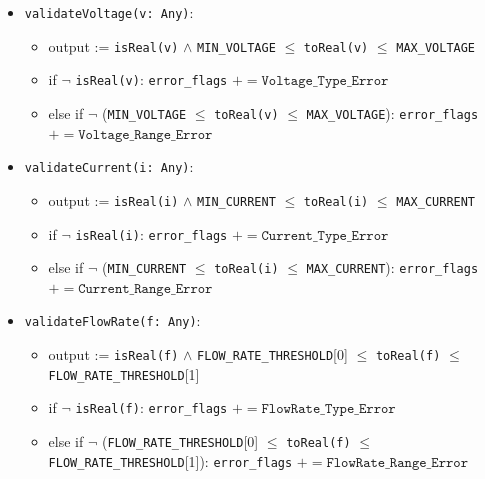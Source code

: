 \documentclass[12pt, titlepage]{article}
\begin{document}
\begin{description}
  \item[Access Routine Semantics:]
  \item
    \begin{itemize}
      \item \texttt{validateVoltage(v: Any)}:
      \begin{itemize}
        \item output := \texttt{isReal(v)} $\land$ \texttt{MIN\_VOLTAGE} $\leq$ \texttt{toReal(v)} $\leq$ \texttt{MAX\_VOLTAGE}
        \item if $\lnot$ \texttt{isReal(v)}: \texttt{error\_flags} $\mathrel{+}= \texttt{Voltage\_Type\_Error}$
        \item else if $\lnot$ (\texttt{MIN\_VOLTAGE} $\leq$ \texttt{toReal(v)} $\leq$ \texttt{MAX\_VOLTAGE}): \texttt{error\_flags} $\mathrel{+}= \texttt{Voltage\_Range\_Error}$
      \end{itemize}
    \end{itemize}

    \item
    
    \begin{itemize}
      \item \texttt{validateCurrent(i: Any)}:
      \begin{itemize}
        \item output := \texttt{isReal(i)} $\land$ \texttt{MIN\_CURRENT} $\leq$ \texttt{toReal(i)} $\leq$ \texttt{MAX\_CURRENT}
        \item if $\lnot$ \texttt{isReal(i)}: \texttt{error\_flags} $\mathrel{+}= \texttt{Current\_Type\_Error}$
        \item else if $\lnot$ (\texttt{MIN\_CURRENT} $\leq$ \texttt{toReal(i)} $\leq$ \texttt{MAX\_CURRENT}): \texttt{error\_flags} $\mathrel{+}= \texttt{Current\_Range\_Error}$
      \end{itemize}
    \end{itemize}
    
    \item 
    
    \begin{itemize}
    \item \texttt{validateFlowRate(f: Any)}:
      \begin{itemize}
        \item output := \texttt{isReal(f)} $\land$ \texttt{FLOW\_RATE\_THRESHOLD}[0] $\leq$ \texttt{toReal(f)} $\leq$ \texttt{FLOW\_RATE\_THRESHOLD}[1]
        \item if $\lnot$ \texttt{isReal(f)}: \texttt{error\_flags} $\mathrel{+}= \texttt{FlowRate\_Type\_Error}$
        \item else if $\lnot$ (\texttt{FLOW\_RATE\_THRESHOLD}[0] $\leq$ \texttt{toReal(f)} $\leq$ \texttt{FLOW\_RATE\_THRESHOLD}[1]): \texttt{error\_flags} $\mathrel{+}= \texttt{FlowRate\_Range\_Error}$
      \end{itemize}
    \end{itemize}
    

\end{description}
\end{document}
